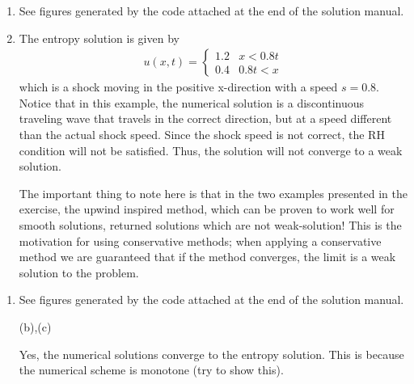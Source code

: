 \documentclass{article}
\begin{document}
\begin{exerciseList}
\begin{enumerate}
\item
See figures generated by the code attached at the end of the solution manual.

\item
The entropy solution is given by 
\begin{gather}
	u(x,t)=\begin{cases}
		1.2 & x<0.8t\\
		0.4 & 0.8t<x
	\end{cases}
\end{gather}
which is a shock moving in the positive x-direction with a speed $s=0.8$. 
Notice that in this example, the numerical solution is a discontinuous traveling wave that travels in the correct direction, but at a speed different than the actual shock speed. Since the shock speed is not correct, the RH condition will not be satisfied. Thus, the solution will not converge to a weak solution. 

The important thing to note here is that in the two examples presented in the exercise, the upwind inspired method, which can be proven to work well for smooth solutions, returned solutions which are not weak-solution! This is the motivation for using conservative methods; when applying a conservative method we are guaranteed that if the method converges, the limit is a weak solution to the problem.
\end{enumerate}



\item
\begin{enumerate}
\item
See figures generated by the code
attached at the end of the solution manual.

\item[(b),(c)]
\addtocounter{enumii}{2}
Yes, the numerical solutions converge to the entropy solution. This is because the numerical scheme is monotone (try to show this).




\end{enumerate}
\end{exerciseList}
\end{document}
